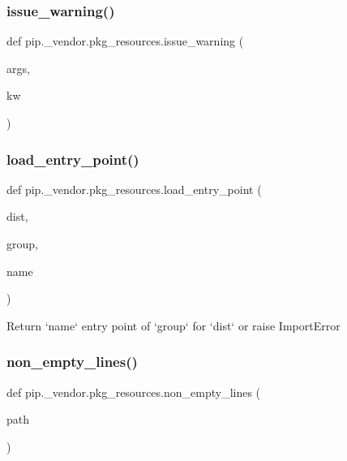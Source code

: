 \subsubsection{\texorpdfstring{issue\+\_\+warning()}{issue\_warning()}}
{\footnotesize\ttfamily def pip.\+\_\+vendor.\+pkg\+\_\+resources.\+issue\+\_\+warning (\begin{DoxyParamCaption}\item[{}]{args,  }\item[{}]{kw }\end{DoxyParamCaption})}

\mbox{\label{namespacepip_1_1__vendor_1_1pkg__resources_a856488c57c641e3cafc340bc64d981c4}} 
\subsubsection{\texorpdfstring{load\+\_\+entry\+\_\+point()}{load\_entry\_point()}}
{\footnotesize\ttfamily def pip.\+\_\+vendor.\+pkg\+\_\+resources.\+load\+\_\+entry\+\_\+point (\begin{DoxyParamCaption}\item[{}]{dist,  }\item[{}]{group,  }\item[{}]{name }\end{DoxyParamCaption})}

\begin{DoxyVerb}Return `name` entry point of `group` for `dist` or raise ImportError\end{DoxyVerb}
 \mbox{\label{namespacepip_1_1__vendor_1_1pkg__resources_a29953f63b3b46343345df0e126dd3b1f}} 
\subsubsection{\texorpdfstring{non\+\_\+empty\+\_\+lines()}{non\_empty\_lines()}}
{\footnotesize\ttfamily def pip.\+\_\+vendor.\+pkg\+\_\+resources.\+non\+\_\+empty\+\_\+lines (\begin{DoxyParamCaption}\item[{}]{path }\end{DoxyParamCaption})}

